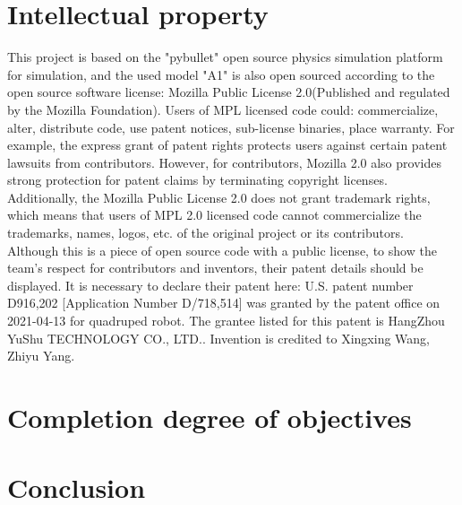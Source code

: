 \section{Intellectual property}
This project is based on the "pybullet" open source physics simulation platform for simulation, and the used model "A1" is also open sourced according to the open source software license: Mozilla Public License 2.0(Published and regulated by the Mozilla Foundation). Users of MPL licensed code could: commercialize, alter, distribute code, use patent notices, sub-license binaries, place warranty. For example, the express grant of patent rights protects users against certain patent lawsuits from contributors. However, for contributors, Mozilla 2.0 also provides strong protection for patent claims by terminating copyright licenses. Additionally, the Mozilla Public License 2.0 does not grant trademark rights, which means that users of MPL 2.0 licensed code cannot commercialize the trademarks, names, logos, etc. of the original project or its contributors. Although this is a piece of open source code with a public license, to show the team's respect for contributors and inventors, their patent details should be displayed. It is necessary to declare their patent here: U.S. patent number D916,202 [Application Number D/718,514] was granted by the patent office on 2021-04-13 for quadruped robot. The grantee listed for this patent is HangZhou YuShu TECHNOLOGY CO., LTD.. Invention is credited to Xingxing Wang, Zhiyu Yang. 


\section{Completion degree of objectives}







\section{Conclusion}